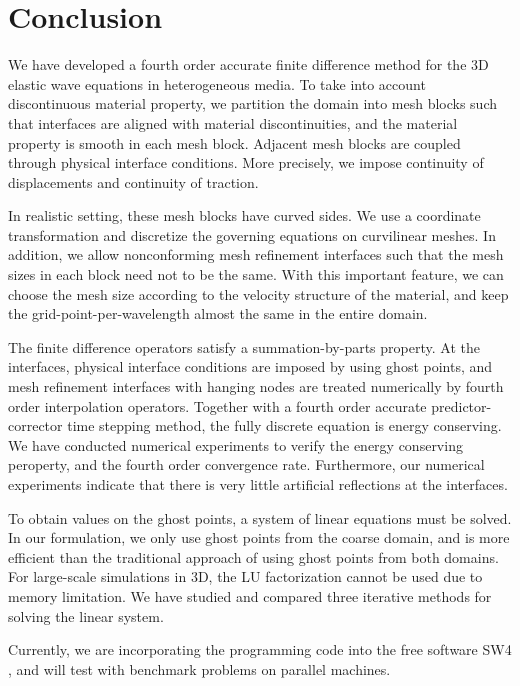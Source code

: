 \section{Conclusion}
We have developed a fourth order accurate finite difference method for the 3D elastic wave equations in heterogeneous media. To take into account discontinuous material property, we partition the domain into mesh blocks such that interfaces are aligned with material discontinuities, and the material property is smooth in each mesh block. Adjacent mesh blocks are coupled through physical interface conditions. More precisely, we impose continuity of displacements and continuity of traction. 

In realistic setting, these mesh blocks have curved sides. We use a coordinate transformation and discretize the governing equations on curvilinear meshes. In addition, we allow nonconforming mesh refinement  interfaces such that the mesh sizes in each block need not to be the same. With this important feature, we can choose the mesh size according to the velocity structure of the material, and keep the grid-point-per-wavelength almost the same in the entire domain. 

The finite difference operators satisfy a summation-by-parts property. At the interfaces, physical interface conditions are imposed by using ghost points, and mesh refinement interfaces with hanging nodes are treated numerically by fourth order interpolation operators. Together with a fourth order accurate predictor-corrector time stepping method, the fully discrete equation is energy conserving. We have conducted numerical experiments to verify the energy conserving peroperty, and the fourth order convergence rate. Furthermore, our numerical experiments indicate that there is very little artificial reflections at the interfaces.

To obtain values on the ghost points, a system of linear equations must be solved. In our formulation, we only use ghost points from the coarse domain, and is more efficient than the traditional approach of using ghost points from both domains.  For large-scale simulations in 3D, the LU factorization cannot be used due to memory limitation. We have studied and compared three iterative methods for solving the linear system.

Currently, we are incorporating the programming code into the free software SW4 \cite{SW4}, and will test with benchmark problems on parallel machines. 